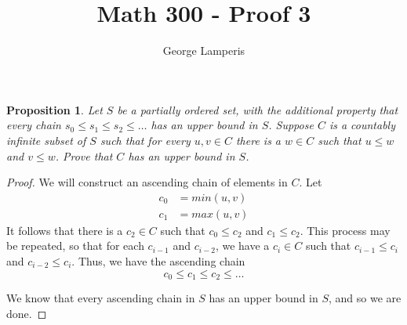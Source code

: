 \documentclass[12pt]{article}
\title{Math 300 - Proof 3}
\author{George Lamperis}
\date{}
\theoremstyle{mystyle}
\newtheorem*{prop}{Proposition}
\begin{document}
\maketitle

\begin{prop}
  Let $S$ be a partially ordered set, with the additional property that every
  chain $s_0 \leq s_1 \leq s_2 \leq \ldots$ has an upper bound in $S$. Suppose
  $C$ is a countably infinite subset of $S$ such that for every $u,v \in C$
  there is a $w \in C$ such that $u \leq w$ and $v \leq w$. Prove that $C$ has 
  an upper bound in $S$.
\end{prop}
\begin{proof}
  We will construct an ascending chain of elements in $C$. Let
  \begin{align*}
    c_0 &= min(u,v) \\
    c_1 &= max(u,v)
  \end{align*}
  It follows that there is a $c_2 \in C$ such that $c_0 \leq c_2$ and 
  $c_1 \leq c_2$. This process may be repeated, so that for each $c_{i-1}$
  and $c_{i-2}$, we have a $c_i \in C$ such that $c_{i-1} \leq c_i$ and
  $c_{i-2} \leq c_i$. Thus, we have the ascending chain
  $$ c_0 \leq c_1 \leq c_2 \leq \ldots$$
  
  We know that every ascending chain in $S$ has an upper bound in $S$, and so we
  are done.
\end{proof}
\end{document}
